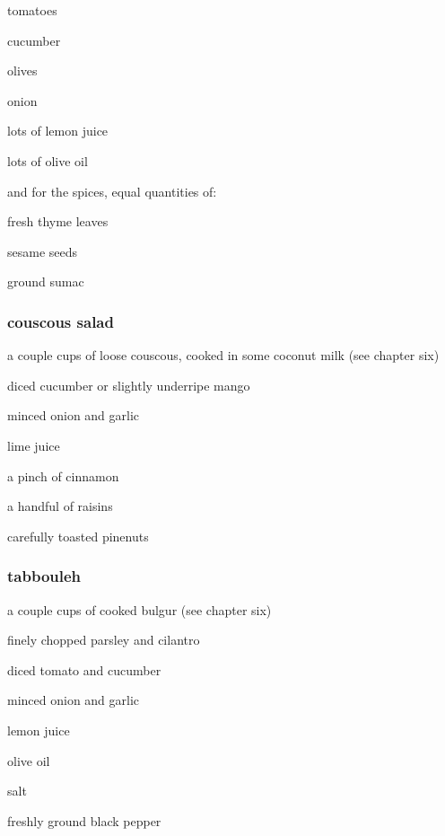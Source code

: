 \begin{ingredients}
  \item tomatoes
  \item cucumber
  \item olives
  \item onion
  \item lots of lemon juice
  \item lots of olive oil
\end{ingredients}

and for the spices, equal quantities of:

\begin{ingredients}
  \item fresh thyme leaves
  \item sesame seeds
  \item ground sumac
\end{ingredients}

\subsubsection{couscous salad}

\begin{ingredients}
  \item a couple cups of loose couscous, cooked in some coconut milk (see chapter six)
  \item diced cucumber or slightly underripe mango
  \item minced onion and garlic
  \item lime juice
  \item a pinch of cinnamon
  \item a handful of raisins
  \item carefully toasted pinenuts
\end{ingredients}

\subsubsection{tabbouleh}

\begin{ingredients}
  \item a couple cups of cooked bulgur (see chapter six)
  \item finely chopped parsley and cilantro
  \item diced tomato and cucumber
  \item minced onion and garlic
  \item lemon juice
  \item olive oil
  \item salt
  \item freshly ground black pepper
\end{ingredients}


